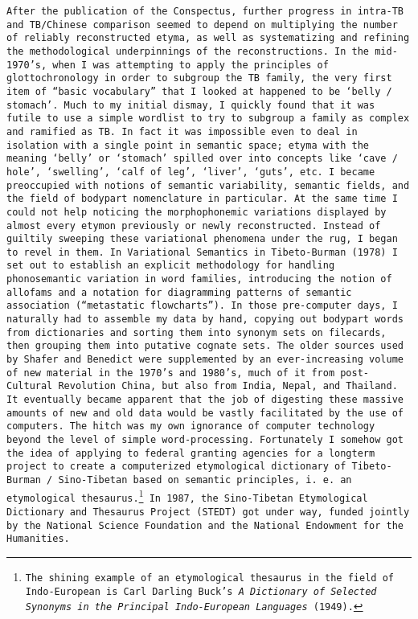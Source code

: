 {\tt After the publication of the Conspectus, further progress in intra-TB and TB/Chinese comparison seemed to depend on multiplying the number of reliably reconstructed etyma, as well as systematizing and refining the methodological underpinnings of the reconstructions. In the mid-1970's, when I was attempting to apply the principles of glottochronology in order to subgroup the TB family, the very first item of ``basic vocabulary'' that I looked at happened to be `belly / stomach'. Much to my initial dismay, I quickly found that it was futile to use a simple wordlist to try to subgroup a family as complex and ramified as TB. In fact it was impossible even to deal in isolation with a single point in semantic space; etyma with the meaning `belly' or `stomach' spilled over into concepts like `cave / hole', `swelling', `calf of leg', `liver', `guts', etc. I became preoccupied with notions of semantic variability, semantic fields, and the field of bodypart nomenclature in particular. At the same time I could not help noticing the morphophonemic variations displayed by almost every etymon previously or newly reconstructed. Instead of guiltily sweeping these variational phenomena under the rug, I began to revel in them. In Variational Semantics in Tibeto-Burman (1978) I set out to establish an explicit methodology for handling phonosemantic variation in word families, introducing the notion of allofams and a notation for diagramming patterns of semantic association (``metastatic flowcharts'').
In those pre-computer days, I naturally had to assemble my data by hand, copying out bodypart words from dictionaries and sorting them into synonym sets on filecards, then grouping them into putative cognate sets. The older sources used by Shafer and Benedict were supplemented by an ever-increasing volume of new material in the 1970's and 1980's, much of it from post-Cultural Revolution China, but also from India, Nepal, and Thailand. It eventually became apparent that the job of digesting these massive amounts of new and old data would be vastly facilitated by the use of computers.
The hitch was my own ignorance of computer technology beyond the level of simple word-processing. Fortunately I somehow got the idea of applying to federal granting agencies for a longterm project to create a computerized etymological dictionary of Tibeto-Burman / Sino-Tibetan based on semantic principles, i.
e. an etymological thesaurus.\footnote{The shining example of an etymological thesaurus in the field of Indo-European is Carl Darling Buck's {\it A Dictionary of Selected Synonyms in the Principal Indo-European Languages} (1949).} In 1987, the Sino-Tibetan Etymological Dictionary and Thesaurus Project (STEDT) got under way, funded jointly by the National Science Foundation and the National Endowment for the Humanities.
}
